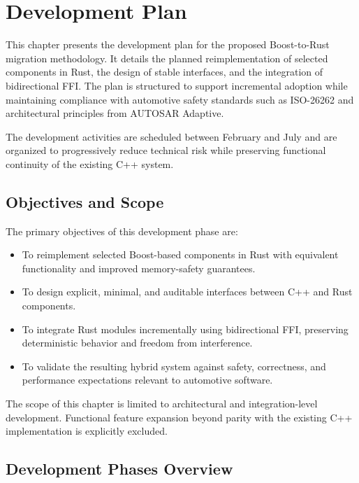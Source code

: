 
\chapter{Development Plan}
\label{chap:Chapter8}

This chapter presents the development plan for the proposed Boost-to-Rust
migration methodology. It details the planned reimplementation of selected
components in Rust, the design of stable interfaces, and the integration of
bidirectional \gls{FFI}. The plan is structured to
support incremental adoption while maintaining compliance with automotive
safety standards such as ISO-26262 and architectural principles from
AUTOSAR Adaptive.

The development activities are scheduled between February and July and are
organized to progressively reduce technical risk while preserving functional
continuity of the existing C++ system.

\section{Objectives and Scope}

The primary objectives of this development phase are:

\begin{itemize}
    \item To reimplement selected Boost-based components in Rust with equivalent
    functionality and improved memory-safety guarantees.
    \item To design explicit, minimal, and auditable interfaces between C++ and
    Rust components.
    \item To integrate Rust modules incrementally using bidirectional \gls{FFI},
    preserving deterministic behavior and freedom from interference.
    \item To validate the resulting hybrid system against safety, correctness,
    and performance expectations relevant to automotive software.
\end{itemize}

The scope of this chapter is limited to architectural and integration-level
development. Functional feature expansion beyond parity with the existing C++
implementation is explicitly excluded.

\section{Development Phases Overview}

